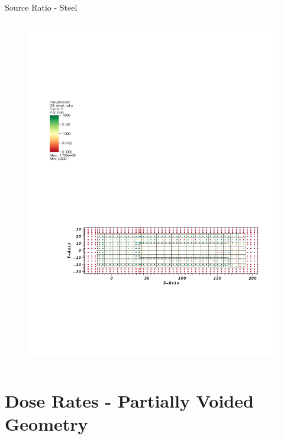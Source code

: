 \documentclass{beamer}
\begin{document}
\begin{frame}{Source Ratio - Steel}
\begin{columns}[T]
        \begin{figure}
                \includegraphics[scale=0.5,trim={1cm 16cm 9cm 5cm},clip]{figs/src_ratio_steel.pdf}
        \end{figure}
  \end{columns}
\end{frame}

\section{Dose Rates - Partially Voided Geometry}
\end{document}
